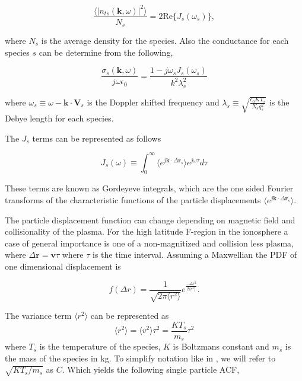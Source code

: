 \begin{equation}
\label{eq:thermalfl}
\frac{\langle|n_{ts}(\mathbf{k},\omega)|^2\rangle}{N_s} = 2\text{Re}\{J_s(\omega_s)\},
\end{equation}

\noindent where $N_s$ is the average density for the species.  Also the conductance for each species $s$ can be determine from the following,

\begin{equation}
\label{eq:cond}
\frac{\sigma_{s}(\mathbf{k},\omega)}{j\omega\epsilon_0} = \frac{1-j\omega_s J_s(\omega_s)}{k^2\lambda_s^2}
\end{equation}

\noindent where $\omega_s \equiv \omega-\mathbf{k}\cdot\mathbf{V}_s $ is the Doppler shifted frequency and $\lambda_s \equiv \sqrt{\frac{\epsilon_0 KT_s}{N_s q_s^2}}$ is the Debye length for each species.

The $J_s$ terms can be represented as follows

\begin{equation}
\label{eq:gord}
J_s(\omega)\equiv \int_0^\infty \langle e^{j\mathbf{k}\cdot\Delta \mathbf{r}_s}\rangle e^{j\omega\tau}d\tau
\end{equation}

\noindent These terms are known as Gordeyeve integrals, which are the one sided Fourier transforms of the characteristic functions of the particle displacements $\langle e^{j\mathbf{k}\cdot\Delta\mathbf{r}_s}\rangle$.  

The particle displacement function can change depending on magnetic field and collisionality of the plasma. For the high latitude F-region in the ionosphere a case of general importance is one of a non-magnitized and collision less plasma, where $\Delta\mathbf{r} = \mathbf{v}\tau$ where $\tau$ is the time interval. Assuming a Maxwellian the PDF of one dimensional displacement is

\begin{equation}
\label{eq:pdfr}
f(\Delta r) = \frac{1}{\sqrt{2\pi \langle r^2 \rangle}}e^{\frac{-\Delta r^2}{2\langle r^2\rangle}}.
\end{equation}
 
\noindent The variance term $\langle r^2 \rangle$ can be represented as
\begin{equation}
\label{eq:var}
\langle r^2 \rangle = \langle v^2 \rangle \tau^2 = \frac{KT_s}{m_s} \tau^2
\end{equation}
 \noindent where $T_s$ is the temperature of the species, $K$ is Boltzmans constant and $m_s$ is the mass of the species in kg. To simplify notation like in \cite{kudeki:milla:1}, we will refer to $\sqrt{KT_s/m_s}$ as $C$. Which yields the following single particle ACF,
 
